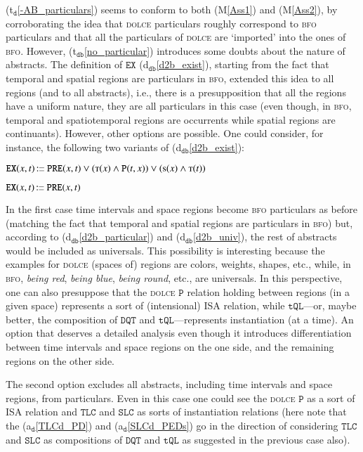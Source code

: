 \documentclass[ao]{iosart2x}
\newcommand{\nb}[1]{\textcolor{red}{$|$}\marginpar{\hspace*{-0cm}\parbox{20mm}{\scriptsize\raggedright\textcolor{red}{#1}}}}
\newcommand{\bflist}{\begin{list}{}{\setlength{\topsep}{2mm}\setlength{\parsep}{0mm}\setlength{\leftmargin}{9.2mm}\setlength{\labelwidth}{8mm}}}
\newcommand{\eflist}{\end{list}}
\newcommand{\dolceAxLabel}{\textrm{a$_\texttt{d}$}}
\newcommand{\dolceThrLabel}{\textrm{t$_\texttt{d}$}}
\newcommand{\dbDefLabel}{\textrm{d$_\texttt{db}$}}
\newcommand{\dbThrLabel}{\textrm{t$_\texttt{db}$}}
\newcommand{\refdolceax}[1]{({\dolceAxLabel}\ref{#1})}
\newcommand{\refdolceth}[1]{({\dolceThrLabel}\ref{#1})}
\newcommand{\refdbdf}[1]{({\dbDefLabel}\ref{#1})}
\newcommand{\refdbth}[1]{({\dbThrLabel}\ref{#1})}
\newcommand{\pr}[1]{\mathtt{#1}}
\newcommand\textequal{%
 \rule[.08ex]{5pt}{0.35pt}\llap{\rule[.78ex]{5pt}{0.35pt}}}
\newcommand{\sdef}{{\hspace{1.5pt}:\hspace{-2.5pt}\textequal\hspace{3pt}}}
\newcommand{\dolce}{{\textsc{dolce}}}
\newcommand{\bfo}{{\textsc{bfo}}}
\newcommand {\Sdcat} {\textsc{s}}
\newcommand {\Tdcat} {\textsc{t}}
\newcommand {\Pd} {\ensuremath{\pr{P}}}
\newcommand {\PREd} {\ensuremath{\pr{PRE}}}
\newcommand {\DQTd} {\ensuremath{\pr{DQT}}}
\newcommand {\TQLd} {\ensuremath{\pr{tQL}}}
\newcommand {\SLCd} {\ensuremath{\pr{SLC}}}
\newcommand {\TLCd} {\ensuremath{\pr{TLC}}}
\newcommand{\bfoexist}{\pr{EX}}
\begin{document}
\refdolceth{-AB_particulars} seems to conform to both (M\ref{Ass1}) and (M\ref{Ass2}), by corroborating the idea that {\dolce} particulars roughly correspond to {\bfo} particulars and that all the particulars of {\dolce} are `imported' into the ones of {\bfo}. However, \refdbth{no_particular} introduces some doubts about the nature of abstracts. The definition of $\bfoexist$ \refdbdf{d2b_exist}, starting from the fact that temporal and spatial regions are particulars in {\bfo}, extended this idea to all regions (and to all abstracts), i.e., there is a presupposition that all the regions have a uniform nature, they are all particulars in this case (even though, in {\bfo}, temporal and spatiotemporal regions are occurrents while spatial regions are continuants). However, other options are possible. One could consider, for instance, the following two variants of \refdbdf{d2b_exist}:
\bflist
\item[] $\bfoexist(x,t)\sdef \PREd(x,t) \lor (\Tdcat(x) \land \Pd(t,x)) \lor (\Sdcat(x) \land \Tdcat(t))$
\item[] $\bfoexist(x,t)\sdef \PREd(x,t)$
\eflist
%
In the first case time intervals and space regions become {\bfo} particulars as before (matching the fact that temporal and spatial regions are particulars in {\bfo}) but, according to \refdbdf{d2b_particular} and \refdbdf{d2b_univ}, the rest of abstracts would be included as universals. This possibility is interesting because the examples for {\dolce} (spaces of) regions are colors, weights, shapes, etc., while, in {\bfo}, \emph{being red}, \emph{being blue}, \emph{being round}, etc., are universals. In this perspective, one can also presuppose that the {\dolce} $\Pd$ relation holding between regions (in a given space) represents a sort of (intensional) ISA relation, while $\TQLd$---or, maybe better, the composition of $\DQTd$ and  $\TQLd$---represents instantiation (at a time). An option that deserves a detailed analysis even though it introduces differentiation between time intervals and space regions on the one side, and the remaining regions on the other side.%

The second option excludes all abstracts, including time intervals and space regions, from particulars. Even in this case one could see the {\dolce} $\Pd$ as a sort of ISA relation and $\TLCd$ and $\SLCd$ as sorts of instantiation relations (here note that the \refdolceax{TLCd_PD} and  \refdolceax{SLCd_PEDs} go in the direction of considering $\TLCd$ and $\SLCd$ as compositions of $\DQTd$ and  $\TQLd$ as suggested in the previous case also).
\end{document}
